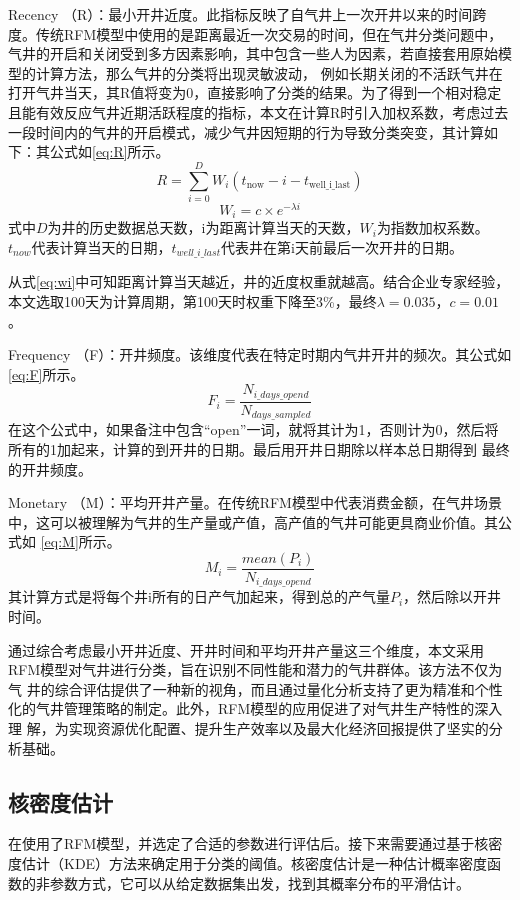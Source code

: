 Recency （R）：最小开井近度。此指标反映了自气井上一次开井以来的时间跨度。传统RFM模型中使用的是距离最近一次交易的时间，但在气井分类问题中，气井的开启和关闭受到多方因素影响，其中包含一些人为因素，若直接套用原始模型的计算方法，那么气井的分类将出现灵敏波动，
例如长期关闭的不活跃气井在打开气井当天，其R值将变为0，直接影响了分类的结果。为了得到一个相对稳定且能有效反应气井近期活跃程度的指标，本文在计算R时引入加权系数，考虑过去一段时间内的气井的开启模式，减少气井因短期的行为导致分类突变，其计算如下：其公式如\eqref{eq:R}所示。
\begin{equation}
    R = \sum_{i=0}^{D} W_i(t_{\text{now}} - i - t_{\text{well\_i\_last}})
    \label{eq:R}
\end{equation}
\begin{equation}
    W_i = c \times e^{-\lambda i}
    \label{eq:wi}
\end{equation}
式中$D$为井的历史数据总天数，i为距离计算当天的天数，$W_i$为指数加权系数。$t_{now}$代表计算当天的日期，$t_{well\_i\_last}$代表井在第i天前最后一次开井的日期。

从式\eqref{eq:wi}中可知距离计算当天越近，井的近度权重就越高。结合企业专家经验，本文选取100天为计算周期，第100天时权重下降至3\%，最终$\lambda = 0.035$，$c = 0.01$。

Frequency （F）：开井频度。该维度代表在特定时期内气井开井的频次。其公式如\eqref{eq:F}所示。
\begin{equation}
    F_i=\frac{N_{i\_days\_opend}}{N_{days\_sampled}}
    \label{eq:F}
\end{equation}
在这个公式中，如果备注中包含“open”一词，就将其计为1，否则计为0，然后将所有的1加起来，计算的到开井的日期。最后用开井日期除以样本总日期得到
最终的开井频度。

Monetary （M）：平均开井产量。在传统RFM模型中代表消费金额，在气井场景中，这可以被理解为气井的生产量或产值，高产值的气井可能更具商业价值。其公式如
\eqref{eq:M}所示。
\begin{equation}
    M_i = \frac{mean(P_i)}{N_{i\_days\_opend}}
    \label{eq:M}
\end{equation}
其计算方式是将每个井i所有的日产气加起来，得到总的产气量$P_i$，然后除以开井时间。

通过综合考虑最小开井近度、开井时间和平均开井产量这三个维度，本文采用RFM模型对气井进行分类，旨在识别不同性能和潜力的气井群体。该方法不仅为气
井的综合评估提供了一种新的视角，而且通过量化分析支持了更为精准和个性化的气井管理策略的制定。此外，RFM模型的应用促进了对气井生产特性的深入理
解，为实现资源优化配置、提升生产效率以及最大化经济回报提供了坚实的分析基础。
\subsection{核密度估计}
在使用了RFM模型，并选定了合适的参数进行评估后。接下来需要通过基于核密度估计（KDE）方法来确定用于分类的阈值。核密度估计是一种估计概率密度函数的非参数方式，它可以从给定数据集出发，找到其概率分布的平滑估计。

